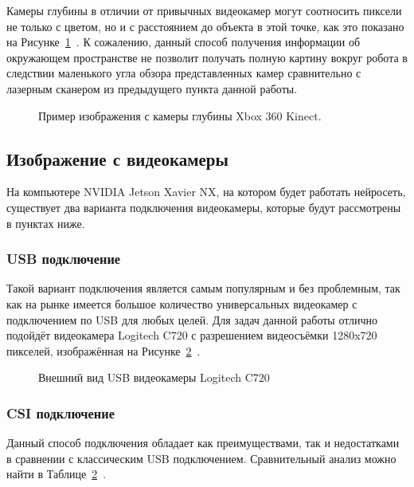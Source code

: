 Камеры глубины в отличии от привычных видеокамер могут соотносить пиксели не только с цветом, но и с расстоянием до объекта в этой точке, как это показано на Рисунке~\cref{fig:depth-example}~\cite{depth-cameras}. К сожалению, данный способ получения информации об окружающем пространстве не позволит получать полную картину вокруг робота в следствии маленького угла обзора представленных камер сравнительно с лазерным сканером из предыдущего пункта данной работы.

\begin{figure}[ht]
    \caption{Пример изображения с камеры глубины Xbox 360 Kinect.}\label{fig:depth-example}
\end{figure}

\subsection{Изображение с видеокамеры}
На компьютере NVIDIA Jetson Xavier NX, на котором будет работать нейросеть, существует два варианта подключения видеокамеры, которые будут рассмотрены в пунктах ниже.

\subsubsection{USB подключение}

Такой вариант подключения является самым популярным и без проблемным, так как на рынке имеется большое количество универсальных видеокамер с подключением по USB для любых целей. Для задач данной работы отлично подойдёт видеокамера Logitech C720 с разрешением видеосъёмки 1280x720 пикселей, изображённая на Рисунке~\cref{fig:usb-camera}~\cite{usb-camera}.

\begin{figure}[ht]
    \caption{Внешний вид USB видеокамеры Logitech C720}\label{fig:usb-camera}
\end{figure}

\subsubsection{CSI подключение}

Данный способ подключения обладает как преимуществами, так и недостатками в сравнении с классическим USB подключением. Сравнительный анализ можно найти в Таблице~\cref{fig:usb-camera}~\cite{compare-csi-usb}.

